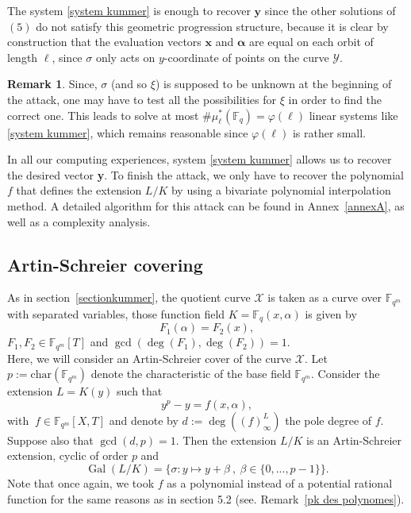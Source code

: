 \documentclass[10pt]{article}
\theoremstyle{definition}
\theoremstyle{definition}
\newtheorem{rq1}[thm]{Remark}
\theoremstyle{definition}
\newcommand{\s}{\vspace{0.3cm}}
\newcommand{\fqm}{\mathbb{F}_{q^m}}
\newcommand{\fq}{\mathbb{F}_q}
\newcommand{\X}{\mathcal{X}}
\newcommand{\Y}{\mathcal{Y}}
\newcommand{\Gal}{\operatorname{Gal}}
\begin{document}
The system \eqref{system kummer} is enough to recover $\mathbf{y}$ since the other solutions of $(5)$ do not satisfy this geometric progression structure, because it is clear by construction that the evaluation vectors $\mathbf{x}$ and $\boldsymbol{\alpha}$ are equal on each orbit of length $\ell$, since $\sigma$ only acts on $y$-coordinate of points on the curve $\Y$. 

\s

\begin{rq1} Since, $\sigma$ (and so $\xi$) is supposed to be unknown at the beginning of the attack, one may have to test all the possibilities for $\xi$ in order to find the correct one. This leads to solve at most $\#\mu^*_{\ell}(\fq) = \varphi(\ell)$ linear systems like \eqref{system kummer}, which remains reasonable since $\varphi(\ell)$ is rather small.
\end{rq1}

\s

In all our computing experiences, system \eqref{system kummer} allows us to recover the desired vector \textbf{y}. To finish the attack, we only have to recover the polynomial $f$ that defines the extension $L/K$ by using a bivariate polynomial interpolation method. A detailed algorithm for this attack can be found in Annex~\ref{annexA}, as well as a complexity analysis.

\s


\subsection{Artin-Schreier covering} \label{sectionas}

\s

As in section~\ref{sectionkummer}, the quotient curve $\X$ is taken as a curve over $\fqm$ with separated variables, those function field $K = \fq(x,\alpha)$ is given by 
\[F_1(\alpha) = F_2(x),\] 
$F_1,F_2 \in \fqm[T]$ and $\gcd(\deg(F_1),\deg(F_2))=1$. \\ 
Here, we will consider an Artin-Schreier cover of the curve $\X$.
Let $p:=\mathrm{char}(\fqm)$ denote the characteristic of the base field $\fqm$. Consider the extension $L=K(y)$ such that
\[y^p-y = f(x,\alpha),\]
with $\ f \in \fqm[X,T]$ and denote by \color{purple} $d:=\deg\left((f)^L_{\infty}\right)$ the pole degree of $f$.\color{black} Suppose also that $\gcd(d,p)=1$. Then the extension $L/K$ is an Artin-Schreier extension, cyclic of order $p$ and 
\[\Gal(L/K) = \{ \sigma : y \mapsto y + \beta \ , \ \beta \in \{0,...,p-1\}\}.\]
Note that once again, we took $f$ as a polynomial instead of a potential rational function for the same reasons as in section 5.2 (see. Remark~\ref{pk des polynomes}).
\end{document}
